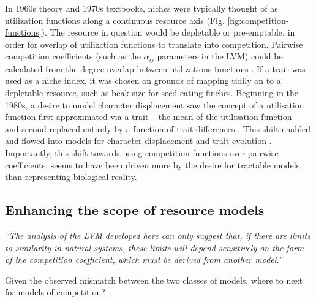 \documentclass[a4paper,11pt]{article}
\begin{document}
In 1960s theory and 1970s textbooks, niches were typically thought of as utilization functions along a continuous resource axis \citep{MacArthur-1967,Abrams-1975} (Fig. \ref{fig:competition-functions}). The resource in question would be depletable or pre-emptable, in order for overlap of utilization functions to translate into competition. Pairwise competition coefficients (such as the $\alpha_{ij}$ parameters in the LVM) could be calculated from the degree overlap between utilizations functions \citep{MacArthur-1967, May-1972, Abrams-1975}. If a trait was used as a niche index, it was chosen on grounds of mapping tidily on to a depletable resource, such as beak size for seed-eating finches. Beginning in the 1980s, a desire to model character displacement saw the concept of a utilisation function first approximated via a trait -- the mean of the utilisation function \citep{Roughgarden-1979} -- and second replaced entirely by a function of trait differences \citep{Slatkin-1980,Taper-1985}. This shift enabled and flowed into models for character displacement \citep[e.g.,][]{Taper-1985, Case-2000, Goldberg-2006} and trait evolution \citep{Brown-1987, Geritz-1998, Geritz-1999, Dieckmann-1999, Abrams-2001}. Importantly, this shift towards using competition functions over pairwise coefficients, seems to have been driven more by the desire for tractable models, than representing biological reality.

\subsection{Enhancing the scope of resource models}

\emph{``The analysis of the LVM developed here can only suggest that, if there are limits to similarity in natural systems, these limits will depend sensitively on the form of the competition coefficient, which must be derived from another model.''}\citep{Abrams-1975}

Given the observed mismatch between the two classes of models, where to next for models of competition?
\end{document}
